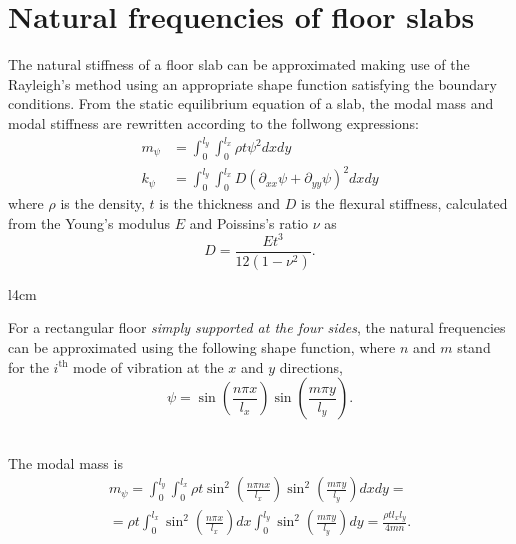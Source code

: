\documentclass{article}
\begin{document}
\section*{Natural frequencies of floor slabs}

The natural stiffness of a floor slab can be approximated making use of the Rayleigh's method using an appropriate shape function satisfying the boundary conditions. From the static equilibrium equation of a slab, the modal mass and modal stiffness are rewritten according to the follwong expressions:
\begin{equation*}
\begin{aligned}
    m_\psi &= \int_0^{l_y}\int_0^{l_x} \rho t \psi^2 dxdy \\
    k_\psi &= \int_0^{l_y}\int_0^{l_x} D (\partial_{xx}\psi + \partial_{yy}\psi)^2 dxdy
\end{aligned}
\end{equation*}
where $\rho$ is the density, $t$ is the thickness and $D$ is the flexural stiffness, calculated from the Young's modulus $E$ and Poissins's ratio $\nu$ as
$$
D = \frac{Et^3}{12(1-\nu^2)}.
$$

\begin{wrapfigure}{l}{4cm}
\vspace{-1em}
\end{wrapfigure}

For a rectangular floor \emph{simply supported at the four sides}, the natural frequencies can be approximated using the following shape function, where $n$ and $m$ stand for the $i^\text{th}$ mode of vibration at the $x$ and $y$ directions,
$$
\psi = \sin\left(\frac{n\pi x}{l_x}\right) \sin\left(\frac{m\pi y}{l_y}\right).
$$
\\\vspace{1pt} %

The modal mass is
\begin{multline*}
m_\psi = 
\int_0^{l_y}\int_0^{l_x} \rho t \sin^2\left(\frac{n\pi nx}{l_x}\right) \sin^2\left(\frac{m\pi y}{l_y}\right) dxdy = \\
= \rho t \int_0^{l_x} \sin^2\left(\frac{n\pi x}{l_x}\right) dx \int_0^{l_y} \sin^2\left(\frac{m\pi y}{l_y}\right) dy =
\frac{\rho t l_x l_y}{4mn}.
\end{multline*}
\end{document}
